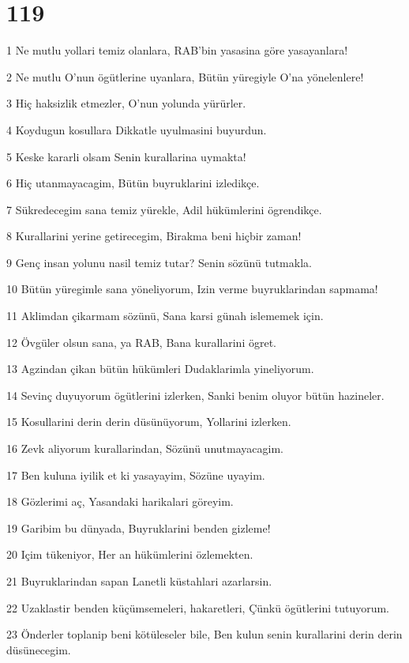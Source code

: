 \chapter{119}

\par 1 Ne mutlu yollari temiz olanlara, RAB'bin yasasina göre yasayanlara!
\par 2 Ne mutlu O'nun ögütlerine uyanlara, Bütün yüregiyle O'na yönelenlere!
\par 3 Hiç haksizlik etmezler, O'nun yolunda yürürler.
\par 4 Koydugun kosullara Dikkatle uyulmasini buyurdun.
\par 5 Keske kararli olsam Senin kurallarina uymakta!
\par 6 Hiç utanmayacagim, Bütün buyruklarini izledikçe.
\par 7 Sükredecegim sana temiz yürekle, Adil hükümlerini ögrendikçe.
\par 8 Kurallarini yerine getirecegim, Birakma beni hiçbir zaman!
\par 9 Genç insan yolunu nasil temiz tutar? Senin sözünü tutmakla.
\par 10 Bütün yüregimle sana yöneliyorum, Izin verme buyruklarindan sapmama!
\par 11 Aklimdan çikarmam sözünü, Sana karsi günah islememek için.
\par 12 Övgüler olsun sana, ya RAB, Bana kurallarini ögret.
\par 13 Agzindan çikan bütün hükümleri Dudaklarimla yineliyorum.
\par 14 Sevinç duyuyorum ögütlerini izlerken, Sanki benim oluyor bütün hazineler.
\par 15 Kosullarini derin derin düsünüyorum, Yollarini izlerken.
\par 16 Zevk aliyorum kurallarindan, Sözünü unutmayacagim.
\par 17 Ben kuluna iyilik et ki yasayayim, Sözüne uyayim.
\par 18 Gözlerimi aç, Yasandaki harikalari göreyim.
\par 19 Garibim bu dünyada, Buyruklarini benden gizleme!
\par 20 Içim tükeniyor, Her an hükümlerini özlemekten.
\par 21 Buyruklarindan sapan Lanetli küstahlari azarlarsin.
\par 22 Uzaklastir benden küçümsemeleri, hakaretleri, Çünkü ögütlerini tutuyorum.
\par 23 Önderler toplanip beni kötüleseler bile, Ben kulun senin kurallarini derin derin düsünecegim.
